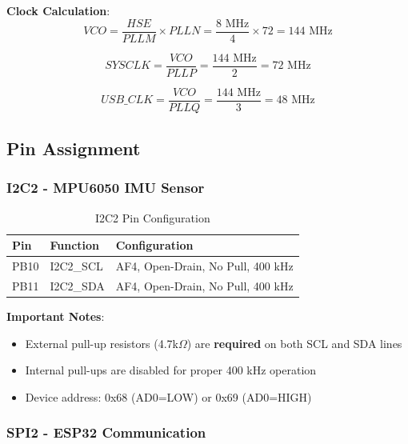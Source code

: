 \documentclass[11pt,a4paper]{article}
\begin{document}
\textbf{Clock Calculation}:
\begin{equation}
VCO = \frac{HSE}{PLLM} \times PLLN = \frac{8\text{ MHz}}{4} \times 72 = 144\text{ MHz}
\end{equation}

\begin{equation}
SYSCLK = \frac{VCO}{PLLP} = \frac{144\text{ MHz}}{2} = 72\text{ MHz}
\end{equation}

\begin{equation}
USB\_CLK = \frac{VCO}{PLLQ} = \frac{144\text{ MHz}}{3} = 48\text{ MHz}
\end{equation}

\subsection{Pin Assignment}

\subsubsection{I2C2 - MPU6050 IMU Sensor}

\begin{table}[H]
\centering
\begin{tabular}{@{}llp{8cm}@{}}
\toprule
\textbf{Pin} & \textbf{Function} & \textbf{Configuration} \\
\midrule
PB10 & I2C2\_SCL & AF4, Open-Drain, No Pull, 400 kHz \\
PB11 & I2C2\_SDA & AF4, Open-Drain, No Pull, 400 kHz \\
\bottomrule
\end{tabular}
\caption{I2C2 Pin Configuration}
\end{table}

\textbf{Important Notes}:
\begin{itemize}
    \item External pull-up resistors (4.7k$\Omega$) are \textbf{required} on both SCL and SDA lines
    \item Internal pull-ups are disabled for proper 400 kHz operation
    \item Device address: 0x68 (AD0=LOW) or 0x69 (AD0=HIGH)
\end{itemize}

\subsubsection{SPI2 - ESP32 Communication}
\end{document}
